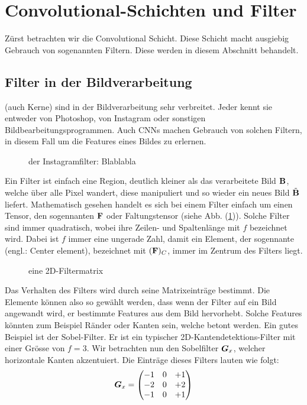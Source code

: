 \para{}
\cite{Goodfellow-et-al-2016}
\cite{deeplearning.ai:cnn}
\cite{wiki:cnn}


\section{Convolutional-Schichten und Filter}
Zürst betrachten wir die Convolutional Schicht. Diese Schicht macht ausgiebig
Gebrauch von sogenannten Filtern. Diese werden in diesem Abschnitt behandelt.

\subsection{Filter in der Bildverarbeitung}
 (auch Kerne) sind in der Bildverarbeitung sehr verbreitet. Jeder kennt sie entweder
von Photoshop, von Instagram oder sonstigen Bildbearbeitungsprogrammen.
Auch CNNs machen Gebrauch von solchen Filtern, in diesem Fall um die Features eines Bildes zu
erlernen.
\begin{figure}[h!]

  \caption{der Instagramfilter: Blablabla}
\end{figure}

\para{}
Ein Filter ist einfach eine Region, deutlich kleiner als das verarbeitete Bild
$\mathbf{B}$, welche
über alle Pixel wandert, diese manipuliert und so wieder ein neues Bild
$\tilde{\mathbf{B}}$ liefert.
Mathematisch gesehen handelt es sich bei einem Filter einfach um einen Tensor,
den sogennanten  $\mathbf{F}$ oder Faltungstensor (siehe Abb.
(\ref{fig:filtermatrix})). Solche Filter sind immer quadratisch, wobei ihre
Zeilen- und Spaltenlänge mit $f$ bezeichnet wird. Dabei ist $f$ immer eine ungerade Zahl, damit ein
Element, der sogennante  (engl.: Center element), bezeichnet mit $(\mathbf{F})_C$,
immer im Zentrum des Filters liegt. \\

\begin{figure}[h!]
  \caption{eine 2D-Filtermatrix}
  \label{fig:filtermatrix}
\end{figure}
\para{}
Das Verhalten des Filters wird durch seine Matrixeinträge bestimmt.
Die Elemente können also so gewählt werden, dass wenn der Filter auf ein Bild
angewandt wird, er bestimmte Features aus dem Bild hervorhebt. Solche Features
könnten zum Beispiel Ränder oder Kanten sein, welche betont werden.
\para{}
Ein gutes Beispiel ist der Sobel-Filter. Er ist ein typischer 2D-Kantendetektions-Filter mit einer
Grösse von $f = 3$. Wir betrachten nun den Sobelfilter $\bm{G}_x$, welcher
horizontale Kanten akzentuiert. Die Einträge dieses Filters lauten wie folgt:
\begin{equation*}
  \bm{G}_x =
  \begin{pmatrix}
    -1 & 0 & +1 \\
    -2 & 0 & +2 \\
    -1 & 0 & +1 \\
  \end{pmatrix}
\end{equation*}

